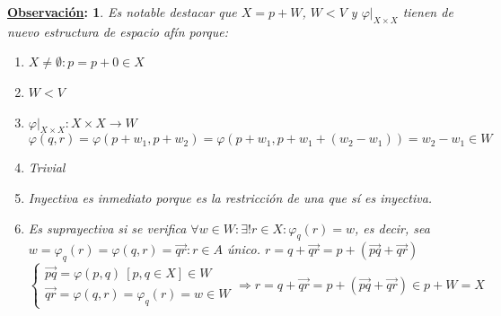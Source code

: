 \documentclass[10pt,a4paper,openright]{book}
\theoremstyle{break}
\newtheorem*{obs}{\underline{Observación}:}
\begin{document}
\begin{obs}
Es notable destacar que $X = p + W$, $W<V$ y $\varphi|_{X \times X}$ tienen de nuevo estructura de espacio afín porque:
\begin{enumerate}
\item $X \neq\emptyset : p = p + 0 \in X $
\item $W < V$
\item $\varphi|_{X \times X} : X \times X \to W$
$$\varphi(q,r) = \varphi (p + w_1, p + w_2) = \varphi(p + w_1, p + w_1 + (w_2 - w_1)) = w_2 - w_1 \in W$$
\item Trivial
\item Inyectiva es inmediato porque es la restricción de una que sí es inyectiva.
\item Es suprayectiva si se verifica $\forall w \in W : \exists! r \in X: \varphi_q (r) = w$, es decir, sea $w =  \varphi_q (r)=\varphi(q,r) = \vec{qr} : r \in A$ único. $r= q + \vec{qr} = p + (\vec{pq} + \vec{qr})$
$$\begin{cases} \vec{pq} = \varphi(p,q) \ [p,q \in X] \in W \\ \vec{qr} = \varphi(q,r) = \varphi_q(r) = w \in W\end{cases} \Rightarrow r= q + \vec{qr} = p + (\vec{pq} + \vec{qr}) \in p + W = X$$
\end{enumerate}
\end{obs}
\end{document}
